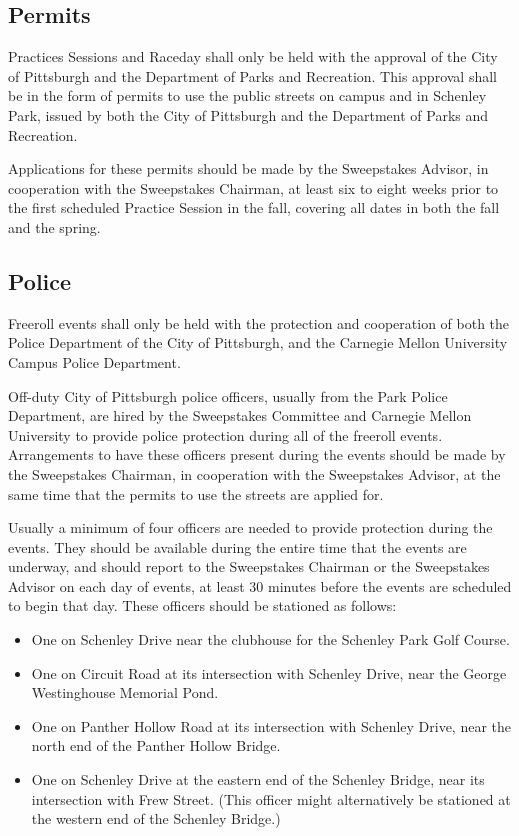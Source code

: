 	
\subsection{Permits}

	Practices Sessions and Raceday shall only be held with the approval of the City of
	Pittsburgh and the Department of Parks and Recreation. This approval shall be
	in the form of permits to use the public streets on campus and in Schenley
	Park, issued by both the City of Pittsburgh and the Department of Parks and Recreation.

	Applications for these permits should be made by the Sweepstakes Advisor, in
	cooperation with the Sweepstakes Chairman, at least six to eight weeks
	prior to the first scheduled Practice Session in the fall, 
	covering all dates in both the fall and the spring.
	
	
\subsection{Police}

	Freeroll events shall only be held with the protection and cooperation of
	both the Police Department of the City of Pittsburgh, and the Carnegie Mellon
	University Campus Police Department.

	Off-duty City of Pittsburgh police officers, usually from the Park Police
	Department, are hired by the Sweepstakes Committee and Carnegie Mellon
	University to provide police protection during all of the freeroll events.
	Arrangements to have these officers present during the events should be made by
	the Sweepstakes Chairman, in cooperation with the Sweepstakes Advisor, at the
	same time that the permits to use the streets are applied for.

	Usually a minimum of four officers are needed to provide protection during the
	events. They should be available during the entire time that the events are
	underway, and should report to the Sweepstakes Chairman or the Sweepstakes
	Advisor on each day of events, at least 30 minutes before the events are
	scheduled to begin that day. These officers should be stationed as follows:

	\begin{itemize}

		\item One on Schenley Drive near the clubhouse for the Schenley Park Golf
		Course.

		\item One on Circuit Road at its intersection with Schenley Drive, near the
		George Westinghouse Memorial Pond.

		\item One on Panther Hollow Road at its intersection with Schenley Drive,
		near the north end of the Panther Hollow Bridge.

		\item One on Schenley Drive at the eastern end of the Schenley Bridge, near
		its intersection with Frew Street. (This officer might alternatively be
		stationed at the western end of the Schenley Bridge.)

	\end{itemize}

